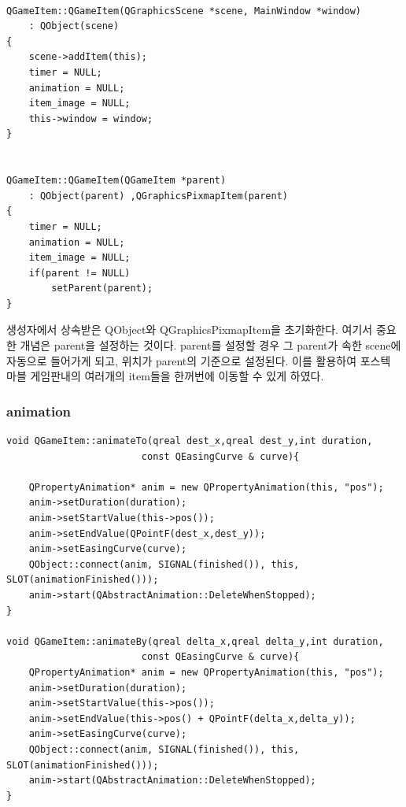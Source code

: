 \documentclass[10pt,oneside,a4paper,titlepage]{article}
\begin{document}
\begin{lstlisting}[frame=single,caption=
{QGameItem constructor},label=code:FD,captionpos=b,framexleftmargin=10pt]

QGameItem::QGameItem(QGraphicsScene *scene, MainWindow *window)
    : QObject(scene)
{
    scene->addItem(this);
    timer = NULL;
    animation = NULL;
    item_image = NULL;
    this->window = window;
}


QGameItem::QGameItem(QGameItem *parent)
    : QObject(parent) ,QGraphicsPixmapItem(parent)
{
    timer = NULL;
    animation = NULL;
    item_image = NULL;
    if(parent != NULL)
        setParent(parent);
}

\end{lstlisting}

생성자에서 상속받은 QObject와 QGraphicsPixmapItem을 초기화한다. 여기서 중요한 개념은 parent을 설정하는 것이다. parent를 설정할 경우 그 parent가 속한 scene에 자동으로 들어가게 되고, 위치가 parent의 기준으로 설정된다. 이를 활용하여 포스텍 마블 게임판내의 여러개의 item들을 한꺼번에 이동할 수 있게 하였다. 

\subsubsection{animation}
\begin{lstlisting}[frame=single,caption=
{QGameItem animation},label=code:FD,captionpos=b,framexleftmargin=10pt]
void QGameItem::animateTo(qreal dest_x,qreal dest_y,int duration,
                        const QEasingCurve & curve){

    QPropertyAnimation* anim = new QPropertyAnimation(this, "pos");
    anim->setDuration(duration);
    anim->setStartValue(this->pos());
    anim->setEndValue(QPointF(dest_x,dest_y));
    anim->setEasingCurve(curve);
    QObject::connect(anim, SIGNAL(finished()), this, SLOT(animationFinished()));
    anim->start(QAbstractAnimation::DeleteWhenStopped);
}

void QGameItem::animateBy(qreal delta_x,qreal delta_y,int duration,
                        const QEasingCurve & curve){
    QPropertyAnimation* anim = new QPropertyAnimation(this, "pos");
    anim->setDuration(duration);
    anim->setStartValue(this->pos());
    anim->setEndValue(this->pos() + QPointF(delta_x,delta_y));
    anim->setEasingCurve(curve);
    QObject::connect(anim, SIGNAL(finished()), this, SLOT(animationFinished()));
    anim->start(QAbstractAnimation::DeleteWhenStopped);
}
\end{lstlisting}
\end{document}
